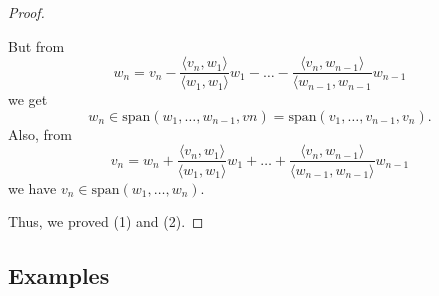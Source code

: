 \documentclass[11pt]{article}
\begin{document}
\begin{proof}
\begin{itemize}
            But from \[w_n = v_n - \frac{\langle v_n, w_1 \rangle}{\langle w_1, w_1 \rangle} w_1 - \dots - \frac{\langle v_n, w_{n-1} \rangle}{\langle w_{n-1}, w_{n-1}} w_{n-1} \] we get \[w_n \in \text{span}(w_1, \dots, w_{n-1}, vn) = \text{span}(v_1, \dots, v_{n-1}, v_n).\] Also, from \[v_n = w_n + \frac{\langle v_n, w_1 \rangle}{\langle w_1, w_1 \rangle} w_1 + \dots + \frac{\langle v_n, w_{n-1} \rangle}{\langle w_{n-1}, w_{n-1} \rangle} w_{n-1}\] we have \(v_n \in \text{span}(w_1, \dots, w_n)\).
        \end{itemize}

        Thus, we proved (1) and (2). 
    \end{proof}

    \subsection{Examples}
\end{document}
